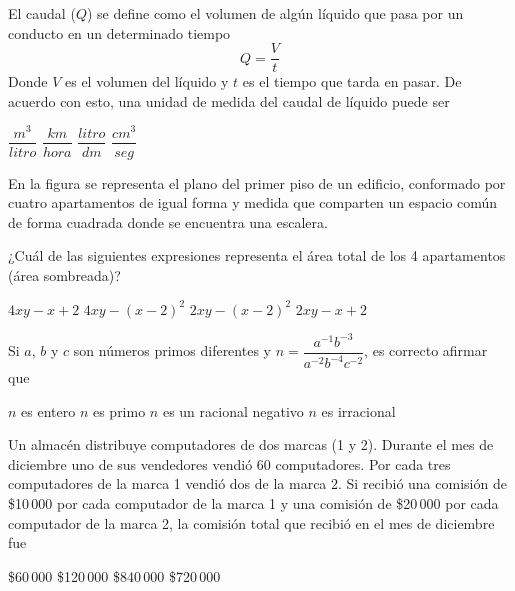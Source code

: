 \documentclass[10pt,letterpaper,addpoints]{exam}
\begin{document}
\begin{questions}
\question
El caudal ($Q$) se define como el volumen de algún líquido que pasa por un conducto en un determinado tiempo
\[Q=\dfrac{V}{t}\]
Donde $V$ es el volumen del líquido y $t$ es el tiempo que tarda en pasar.
De acuerdo con esto, una unidad de medida del caudal de líquido puede ser

\begin{oneparchoices}
\choice $\dfrac{m^{3}}{litro}$
\choice $\dfrac{km}{hora}$
\choice $\dfrac{litro}{dm}$
\CorrectChoice $\dfrac{cm^{3}}{seg}$
\end{oneparchoices}
\question En la figura se representa el plano del primer piso de un edificio, conformado por cuatro apartamentos de igual forma y medida que comparten un espacio común de forma cuadrada donde se encuentra una escalera.
\begin{center}
\end{center}
¿Cuál de las siguientes expresiones representa el área total de los 4 apartamentos (área sombreada)?

\begin{oneparchoices}
\choice $4xy-x+2$
\CorrectChoice $4xy-(x-2)^{2}$
\choice $2xy-(x-2)^{2}$
\choice $2xy-x+2$
\end{oneparchoices}
\question
Si $a$, $b$ y $c$ son números primos diferentes y $n=\dfrac{a^{-1}b^{-3}}{a^{-2}b^{-4}c^{-2}}$, es correcto afirmar que
\begin{choices}
\begin{multicols}{2}
 \CorrectChoice $n$ es entero
 \choice $n$ es primo
 \choice $n$ es un racional negativo
 \choice $n$ es irracional
\end{multicols}
\end{choices}
\question Un almacén distribuye computadores de dos marcas (1 y 2). Durante el mes de diciembre uno de sus vendedores vendió 60 computadores. Por cada tres computadores de la marca 1 vendió dos de la marca 2. Si recibió una comisión de \$10\,000 por cada computador de la marca 1 y una comisión de \$20\,000 por cada computador de la marca 2, la comisión total que recibió en el mes de diciembre fue

\begin{oneparchoices}
  \choice \$60\,000
  \choice \$120\,000
  \CorrectChoice \$840\,000
  \choice \$720\,000
\end{oneparchoices}
\end{questions}
\end{document}
